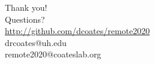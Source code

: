 \documentclass[10pt]{beamer}
\begin{document}
\begin{frame}[standout]
  Thank you! \\
    Questions? \\ \vspace{0.5in}
    \url{http://github.com/dcoates/remote2020} \\
  drcoates@uh.edu \\
  remote2020@coateslab.org
\end{frame}
\end{document}
